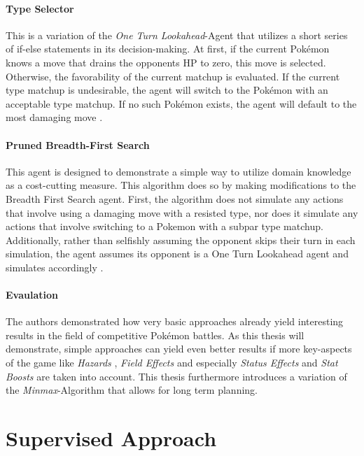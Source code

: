 \paragraph{Type Selector}
This is a variation of the \textit{One Turn Lookahead}-Agent that utilizes a short series of
if-else statements in its decision-making. At first, if the current Pokémon knows a move 
that drains the opponents \ac{HP} to zero, this move is selected. Otherwise, the 
favorability of the current matchup is evaluated. If the current type matchup is 
undesirable, the agent will switch to the Pokémon with an acceptable type matchup. If no
such Pokémon exists, the agent will default to the most damaging move 
\cite{Lee_Togelius_2017}.

\paragraph{Pruned Breadth-First Search}
This agent is designed to demonstrate a simple way to utilize domain knowledge as a cost-cutting 
measure. This algorithm does so by making modifications to the Breadth First Search agent. First, 
the algorithm does not simulate any actions that involve using a damaging move with a resisted type, 
nor does it simulate any actions that involve switching to a Pokemon with a subpar type matchup. 
Additionally, rather than selfishly assuming the opponent skips their turn in each simulation, the 
agent assumes its opponent is a One Turn Lookahead agent and simulates accordingly
\cite{Lee_Togelius_2017}.

\paragraph{Evaulation}
The authors demonstrated how very basic approaches already yield interesting results in the 
field of competitive Pokémon battles. As this thesis will demonstrate, simple approaches can 
yield even better results if more key-aspects of the game like \textit{Hazards} ,
\textit{Field Effects}  and especially \textit{Status Effects}
 and \textit{Stat Boosts} are taken into account. This thesis furthermore
introduces a variation of the \textit{Minmax}-Algorithm that allows for long term planning.

\section{Supervised Approach}


